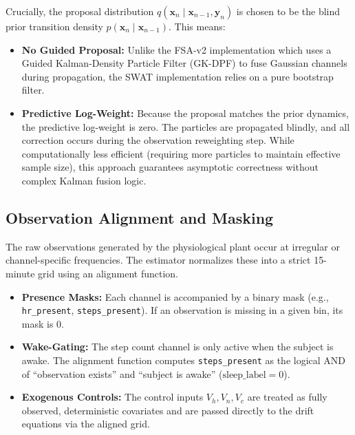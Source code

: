 \documentclass[11pt,a4paper]{article}
\begin{document}
Crucially, the proposal distribution $q(\mathbf{x}_n \mid \mathbf{x}_{n-1}, \mathbf{y}_n)$ is chosen to be the blind prior transition density $p(\mathbf{x}_n \mid \mathbf{x}_{n-1})$. This means:
\begin{itemize}
    \item \textbf{No Guided Proposal:} Unlike the FSA-v2 implementation which uses a Guided Kalman-Density Particle Filter (GK-DPF) to fuse Gaussian channels during propagation, the SWAT implementation relies on a pure bootstrap filter.
    \item \textbf{Predictive Log-Weight:} Because the proposal matches the prior dynamics, the predictive log-weight is zero. The particles are propagated blindly, and all correction occurs during the observation reweighting step. While computationally less efficient (requiring more particles to maintain effective sample size), this approach guarantees asymptotic correctness without complex Kalman fusion logic.
\end{itemize}

\subsection{Observation Alignment and Masking}
The raw observations generated by the physiological plant occur at irregular or channel-specific frequencies. The estimator normalizes these into a strict 15-minute grid using an alignment function. 
\begin{itemize}
    \item \textbf{Presence Masks:} Each channel is accompanied by a binary mask (e.g., \texttt{hr\_present}, \texttt{steps\_present}). If an observation is missing in a given bin, its mask is 0.
    \item \textbf{Wake-Gating:} The step count channel is only active when the subject is awake. The alignment function computes \texttt{steps\_present} as the logical AND of ``observation exists'' and ``subject is awake'' ($\text{sleep\_label} = 0$).
    \item \textbf{Exogenous Controls:} The control inputs $V_h, V_n, V_c$ are treated as fully observed, deterministic covariates and are passed directly to the drift equations via the aligned grid.
\end{itemize}
\end{document}
